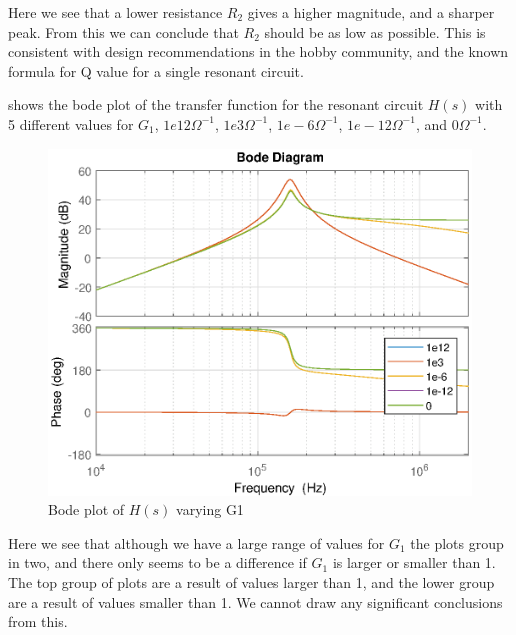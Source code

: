Here we see that a lower resistance $R_2$ gives a higher magnitude, and a sharper peak. From this we can conclude that $R_2$ should be as low as possible. This is consistent with design recommendations in the hobby community, and the known formula for Q value for a single resonant circuit.

\newpage
{} shows the bode plot of the transfer function for the resonant circuit $H(s)$ with 5 different values for $G_1$, $1e12{\Omega}^{-1}$, $1e3{\Omega}^{-1}$, $1e-6{\Omega}^{-1}$, $1e-12{\Omega}^{-1}$, and $0{\Omega}^{-1}$.

\begin{figure}[H]
    \centering
    \includegraphics[width=\textwidth]{img/CoilRigBode_G1.eps}
    \caption{Bode plot of $H(s)$ varying G1}
    \label{fig:bode_g1}
\end{figure}

Here we see that although we have a large range of values for $G_1$ the plots group in two, and there only seems to be a difference if $G_1$ is larger or smaller than 1. The top group of plots are a result of values larger than 1, and the lower group are a result of values smaller than 1. We cannot draw any significant conclusions from this.

